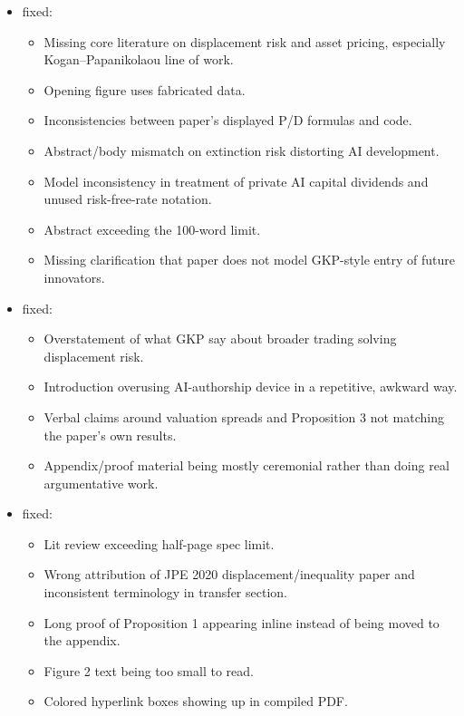 \begin{itemize}
\item {} fixed:
\begin{itemize}
\item Missing core literature on displacement risk and asset pricing, especially Kogan--Papanikolaou line of work.
\item Opening figure uses fabricated data.
\item Inconsistencies between paper's displayed P/D formulas and code.
\item Abstract/body mismatch on extinction risk distorting AI development.
\item Model inconsistency in treatment of private AI capital dividends and unused risk-free-rate notation.
\item Abstract exceeding the 100-word limit.
\item Missing clarification that paper does not model GKP-style entry of future innovators.
\end{itemize}

\item {} fixed:
\begin{itemize}
\item Overstatement of what GKP say about broader trading solving displacement risk.
\item Introduction overusing AI-authorship device in a repetitive, awkward way.
\item Verbal claims around valuation spreads and Proposition 3 not matching the paper's own results.
\item Appendix/proof material being mostly ceremonial rather than doing real argumentative work.
\end{itemize}

\item {} fixed:
\begin{itemize}
\item Lit review exceeding half-page spec limit.
\item Wrong attribution of JPE 2020 displacement/inequality paper and inconsistent terminology in transfer section.
\item Long proof of Proposition 1 appearing inline instead of being moved to the appendix.
\item Figure 2 text being too small to read.
\item Colored hyperlink boxes showing up in compiled PDF.
\end{itemize}


\end{itemize}
